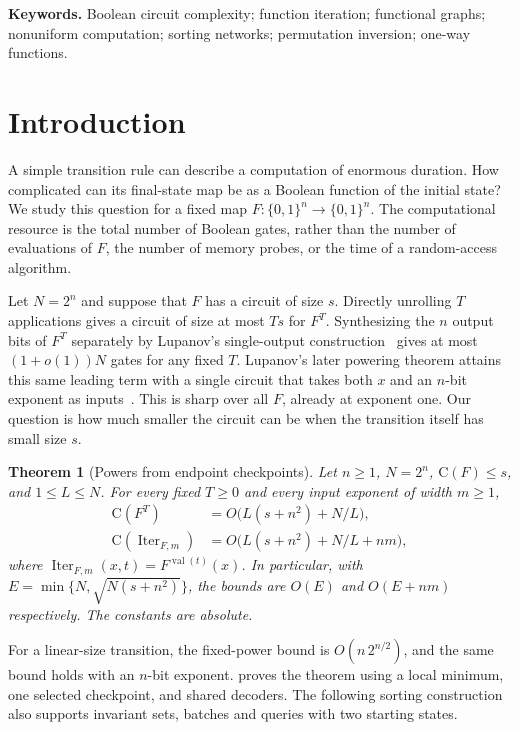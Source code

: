 \documentclass[11pt]{article}
\newtheorem{theorem}{Theorem}[section]
\theoremstyle{definition}
\theoremstyle{remark}
\newcommand{\bits}{\{0,1\}}
\newcommand{\CC}{\mathrm{C}}
\newcommand{\Iter}{\operatorname{Iter}}
\numberwithin{equation}{section}
\begin{document}
\noindent\textbf{Keywords.} Boolean circuit complexity; function iteration;
functional graphs; nonuniform computation; sorting networks; permutation
inversion; one-way functions.

\section{Introduction}\label{sec:intro}

A simple transition rule can describe a computation of enormous duration.
How complicated can its final-state map be as a Boolean function of the
initial state?  We study this question for a fixed map
$F:\bits^n\to\bits^n$.  The computational resource is the total number of
Boolean gates, rather than the number of evaluations of $F$, the number of
memory probes, or the time of a random-access algorithm.

Let $N=2^n$ and suppose that $F$ has a circuit of size $s$.  Directly
unrolling $T$ applications gives a circuit of size at most $Ts$ for $F^T$.
Synthesizing the $n$ output bits of $F^T$ separately by Lupanov's
single-output construction~\cite{Lupanov58} gives at most $(1+o(1))N$
gates for any fixed $T$.  Lupanov's later powering theorem attains this
same leading term with a single circuit that takes both $x$ and an $n$-bit
exponent as inputs~\cite[p.~180]{Lupanov03}.  This is sharp over all $F$,
already at exponent one.  Our question is how much smaller the circuit
can be when the transition itself has small size $s$.

\begin{theorem}[Powers from endpoint checkpoints]\label{thm:endpoint}
Let $n\ge1$, $N=2^n$, $\CC(F)\le s$, and $1\le L\le N$. For every
fixed $T\ge0$ and every input exponent of width $m\ge1$,
\begin{align}
 \CC(F^T)&=O\bigl(L(s+n^2)+N/L\bigr),\label{eq:endpoint-fixed}\\
 \CC(\Iter_{F,m})&=O\bigl(L(s+n^2)+N/L+nm\bigr),\label{eq:endpoint-live}
\end{align}
where $\Iter_{F,m}(x,t)=F^{\operatorname{val}(t)}(x)$.
In particular, with $E=\min\{N,\sqrt{N(s+n^2)}\}$, the bounds are
$O(E)$ and $O(E+nm)$ respectively. The constants are absolute.
\end{theorem}

For a linear-size transition, the fixed-power bound is $O(n\,2^{n/2})$,
and the same bound holds with an $n$-bit exponent. 
proves the theorem using a local minimum, one selected checkpoint, and
shared decoders. The following sorting construction also supports
invariant sets, batches and queries with two starting states.
\end{document}
